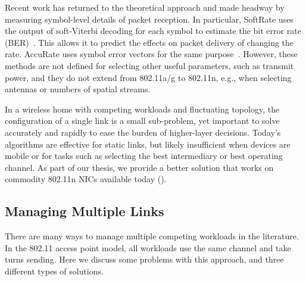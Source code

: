 
Recent work has returned to the theoretical approach and made headway by measuring symbol-level details of packet reception. In particular, SoftRate uses the output of soft-Viterbi decoding for each symbol to estimate the bit error rate (BER)~\cite{Vutukuru_SoftRate}. This allows it to predict the effects on packet delivery of changing the rate. AccuRate uses symbol error vectors for the same purpose~\cite{accurate_nsdi10}.  However, these methods are not defined for selecting other useful parameters, such as transmit power, and they do not extend from 802.11a/g to 802.11n, e.g., when selecting antennas or numbers of spatial streams.

In a wireless home with competing workloads and fluctuating topology, the configuration of a single link is a small sub-problem, yet important to solve accurately and rapidly to ease the burden of higher-layer decisions. Today's algorithms are effective for static links, but likely insufficient when devices are mobile or for tasks such as selecting the best intermediary or best operating channel. As part of our thesis, we provide a better solution that works on commodity 802.11n NICs available today ().

\subsection{Managing Multiple Links}
There are many ways to manage multiple competing workloads in the literature. In the 802.11 access point model, all workloads use the same channel and take turns sending. Here we discuss some problems with this approach, and three different types of solutions.

